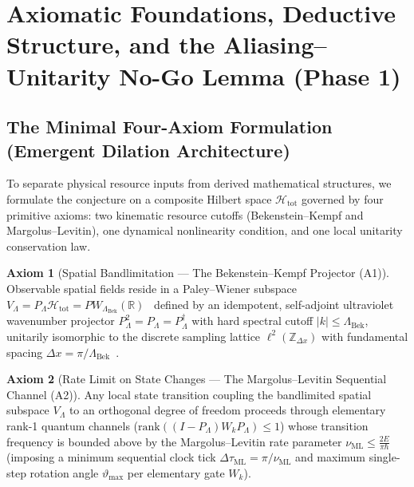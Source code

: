 \documentclass[11pt,a4paper]{article}
\theoremstyle{definition}
\newtheorem{axiom}{Axiom}[section]
\begin{document}
\section{Axiomatic Foundations, Deductive Structure, and the Aliasing--Unitarity No-Go Lemma (Phase 1)}
\label{sec:phase1}
\subsection{The Minimal Four-Axiom Formulation (Emergent Dilation Architecture)}
\label{subsec:minimal-axioms}
To separate physical resource inputs from derived mathematical structures, we formulate the conjecture on a composite Hilbert space $\mathcal{H}_{\text{tot}}$ governed by four primitive axioms: two kinematic resource cutoffs (Bekenstein--Kempf and Margolus--Levitin), one dynamical nonlinearity condition, and one local unitarity conservation law.
\begin{axiom}[Spatial Bandlimitation --- The Bekenstein--Kempf Projector (A1)]
\label{ax:a1}
Observable spatial fields reside in a Paley--Wiener subspace $V_{\Lambda} = P_{\Lambda}\mathcal{H}_{\text{tot}} = PW_{\Lambda_{\text{Bek}}}(\mathbb{R})$~\cite{kempf2004,pye2015} defined by an idempotent, self-adjoint ultraviolet wavenumber projector $P_{\Lambda}^2 = P_{\Lambda} = P_{\Lambda}^\dagger$ with hard spectral cutoff $|k| \le \Lambda_{\text{Bek}}$, unitarily isomorphic to the discrete sampling lattice $\ell^2(\mathbb{Z}_{\Delta x})$ with fundamental spacing $\Delta x = \pi / \Lambda_{\text{Bek}}$~\cite{shannon1949}.
\end{axiom}
\begin{axiom}[Rate Limit on State Changes --- The Margolus--Levitin Sequential Channel (A2)]
\label{ax:a2}
Any local state transition coupling the bandlimited spatial subspace $V_{\Lambda}$ to an orthogonal degree of freedom proceeds through elementary rank-1 quantum channels ($\mathrm{rank}((I - P_{\Lambda}) W_k P_{\Lambda}) \le 1$) whose transition frequency is bounded above by the Margolus--Levitin rate parameter $\nu_{\text{ML}} \le \frac{2E}{\pi\hbar}$~\cite{margolus1998,mandelstam1945} (imposing a minimum sequential clock tick $\Delta\tau_{\text{ML}} = \pi / \nu_{\text{ML}}$ and maximum single-step rotation angle $\vartheta_{\max}$ per elementary gate $W_k$).
\end{axiom}
\end{document}
